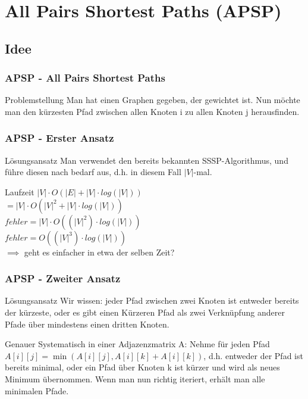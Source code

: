 \section{All Pairs Shortest Paths (APSP)} 

\subsection{Idee} 

\begin{frame}
\frametitle{APSP - All Pairs Shortest Paths}
\begin{block}{Problemstellung}
Man hat einen Graphen gegeben, der gewichtet ist. Nun möchte man den kürzesten Pfad zwischen allen Knoten i zu allen Knoten j herausfinden.
\end{block}
\end{frame}


\begin{frame}
\frametitle{APSP - Erster Ansatz}
\begin{block}{Lösungsansatz}
Man verwendet den bereits bekannten SSSP-Algorithmus, und führe diesen nach bedarf aus, d.h. in diesem Fall $|V|$-mal.
\end{block}

\begin{block}{Laufzeit}
$|V| \cdot O (|E| + |V| \cdot log(|V|))$\\$
= |V| \cdot O (|V|^2 + |V| \cdot log(|V|))$\\$ fehler
= |V| \cdot O ((|V|^2) \cdot log(|V|)) $\\$ fehler 
= O ((|V|^3) \cdot log(|V|))$\\
$\implies$ geht es einfacher in etwa der selben Zeit?
\end{block}
\end{frame}


\begin{frame}
\frametitle{APSP - Zweiter Ansatz}
\begin{block}{Lösungsansatz}
Wir wissen: jeder Pfad zwischen zwei Knoten ist entweder bereits der kürzeste, oder es gibt einen Kürzeren Pfad als zwei Verknüpfung anderer Pfade über mindestens einen dritten Knoten.
\end{block}

\begin{block}{Genauer}
Systematisch in einer Adjazenzmatrix A:
Nehme für jeden Pfad $A[i][j] = \min\left(A[i][j], A[i][k] + A[i][k]\right)$, d.h. entweder der Pfad ist bereits minimal, oder ein Pfad über Knoten k ist kürzer und wird als neues Minimum übernommen.
Wenn man nun richtig iteriert, erhält man alle minimalen Pfade.
\end{block}
\end{frame}

